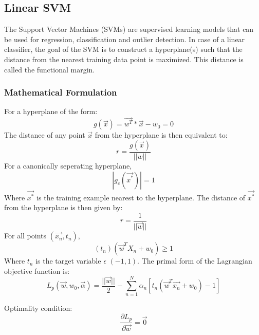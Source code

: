 \documentclass[11pt,a4paper]{article}
\newcommand{\noi}{\noindent}
\begin{document}
\subsection{Linear SVM}

\label{subsection:1a_svm}
The Support Vector Machines (SVMs) are supervised learning models that can be used for regression, classification and outlier detection. In case of a linear classifier, the goal of the SVM is to construct a hyperplane(s) such that the distance from the nearest training data point is maximized. This distance is called the functional margin.  


\subsubsection{Mathematical Formulation}
\noindent
For a hyperplane of the form:
\begin{equation}
    g(\vec{x})=\vec{w^{T}}*\vec{x}-w_{0}=0
\end{equation}
\noi
The distance of any point $\vec{x}$ from the hyperplane is then equivalent to: 
\begin{equation}
    r=\frac{g(\vec{x})}{||w||}
\end{equation}
\noi
For a canonically seperating hyperplane, 
\begin{equation}
    |g_c(\vec{x^*})|=1
\end{equation}
\noi
Where $\vec{x^*}$ is the training example nearest to the hyperplane. 
The distance of $\vec{x^*}$ from the hyperplane is then given by:
\begin{equation}
    r=\frac{1}{||\vec{w}||}
\end{equation}
\noi
For all points $(\vec{x_n},t_n)$, 
\begin{equation}
    (t_n)(\vec{w}^{T}X_n+w_0) \geq 1
\end{equation}
\noi
Where $t_n$ is the target variable $\epsilon$ $(-1,1)$.
\noi
The primal form of the Lagrangian objective function is:
\begin{equation}
    L_p(\vec{w},w_0,\vec{\alpha})=\frac{||\vec{w}||}{2}-\sum_{n=1}^{N}\alpha_n[t_n(\vec{w}^T\vec{x_n}+w_0)-1]
\end{equation}

\noi
Optimality condition:
\begin{equation}
    \frac{\partial L_p}{\partial \vec{w}}=\vec{0}
\end{equation}
\end{document}
